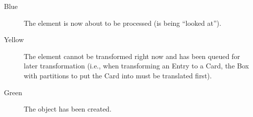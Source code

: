 \begin{itemize}
\begin{description}
  \item[Blue] The element is now about to be processed (is being ``looked at'').
  
  \item[Yellow] The element cannot be transformed right now and has been queued for later transformation (i.e., when transforming an Entry to a Card, the Box
  with partitions to put the Card into must be translated first).
  
  \item[Green] The object has been created.
\end{description}

\end{itemize}
